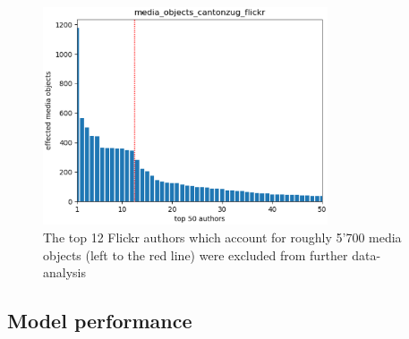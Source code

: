 \begin{figure}[ht]
   \centering
   \includegraphics[width=0.75\textwidth]{img/cantonzug_flickr_top50_w_line.eps}
   \caption{The top 12 Flickr authors which account for roughly 5'700 media objects (left to the red line) were excluded from further data-analysis}
   \label{img:dominant_users_flickr}
\end{figure}



\subsection{Model performance}

